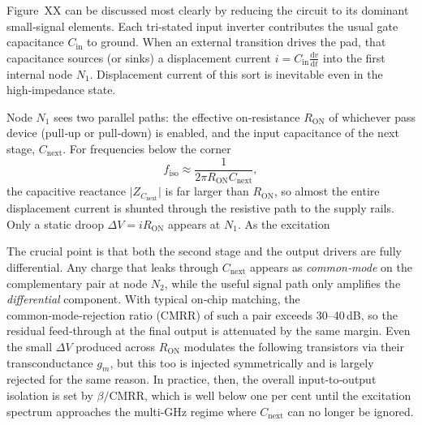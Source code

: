 Figure~XX can be discussed most clearly by reducing the circuit to its dominant small‑signal elements. Each tri‑stated input inverter contributes the usual gate capacitance \(C_{\text{in}}\) to ground. When an external transition drives the pad, that capacitance sources (or sinks) a displacement current \(i = C_{\text{in}}\frac{\mathrm{d}v}{\mathrm{d}t}\) into the first internal node \(N_{1}\). Displacement current of this sort is inevitable even in the high‑impedance state.

Node \(N_{1}\) sees two parallel paths: the effective on‑resistance \(R_{\text{ON}}\) of whichever pass device (pull‑up or pull‑down) is enabled, and the input capacitance of the next stage, \(C_{\text{next}}\). For frequencies below the corner
\[
f_{\text{iso}} \approx \frac{1}{2\pi R_{\text{ON}} C_{\text{next}}},
\]
the capacitive reactance \(\lvert Z_{C_{\text{next}}}\rvert\) is far larger than \(R_{\text{ON}}\), so almost the entire displacement current is shunted through the resistive path to the supply rails. Only a static droop \(\Delta V = i R_{\text{ON}}\) appears at \(N_{1}\). As the excitation 

The crucial point is that both the second stage and the output drivers are fully differential. Any charge that leaks through \(C_{\text{next}}\) appears as \emph{common‑mode} on the complementary pair at node \(N_{2}\), while the useful signal path only amplifies the \emph{differential} component. With typical on‑chip matching, the common‑mode‑rejection ratio (CMRR) of such a pair exceeds 30–40 dB, so the residual feed‑through at the final output is attenuated by the same margin. Even the small \(\Delta V\) produced across \(R_{\text{ON}}\) modulates the following transistors via their transconductance \(g_{m}\), but this too is injected symmetrically and is largely rejected for the same reason. In practice, then, the overall input‑to‑output isolation is set by \(\beta/\text{CMRR}\), which is well below one per cent until the excitation spectrum approaches the multi‑GHz regime where \(C_{\text{next}}\) can no longer be ignored.
